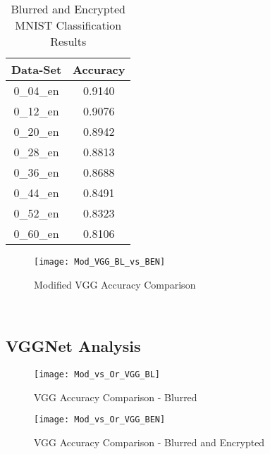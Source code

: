 \documentclass[12pt, titlepage]{article}
\begin{document}
\begin{table}[!h]
	\begin{center}
		\begin{tabular}{| c | c |}
			\hline
			\textbf{Data-Set} & \textbf{Accuracy}\\
			\hline
			0\_04\_en & 0.9140\\
			\hline
			0\_12\_en & 0.9076\\
			\hline
			0\_20\_en & 0.8942\\
			\hline
			0\_28\_en & 0.8813\\
			\hline
			0\_36\_en & 0.8688\\
			\hline
			0\_44\_en & 0.8491\\
			\hline
			0\_52\_en & 0.8323\\
			\hline
			0\_60\_en & 0.8106\\
			\hline
		\end{tabular}
		\caption{Blurred and Encrypted MNIST Classification Results}
		\label{table:modVGG_BlurredEncrypted}
	\end{center}
\end{table} 

\begin{figure}[h!]
	\begin{center}
		\texttt{[image: Mod\_VGG\_BL\_vs\_BEN]}
		\caption{Modified VGG Accuracy Comparison}
		\label{GRAPH_ModifiedVGG}
	\end{center}
\end{figure} 

~\newpage
\subsection{VGGNet Analysis} 

\begin{figure}[h!]
	\begin{center}
		\texttt{[image: Mod\_vs\_Or\_VGG\_BL]}
		\caption{VGG Accuracy Comparison - Blurred}
		\label{GRAPH_COMP_VGG_BL}
	\end{center}
\end{figure}

\begin{figure}[h!]
	\begin{center}
		\texttt{[image: Mod\_vs\_Or\_VGG\_BEN]}
		\caption{VGG Accuracy Comparison - Blurred and Encrypted}
		\label{GRAPH_COMP_VGG_BEN}
	\end{center}
\end{figure}
\end{document}
